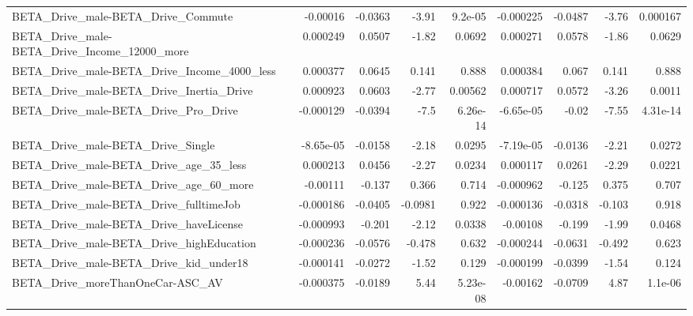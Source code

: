 \begin{tabular}{lrrrrrrrr}
BETA\_Drive\_male-BETA\_Drive\_Commute                 &    -0.00016 &      -0.0363 &    -3.91 &  9.2e-05 &  -0.000225 &     -0.0487 &        -3.76 &      0.000167 \\
BETA\_Drive\_male-BETA\_Drive\_Income\_12000\_more       &    0.000249 &       0.0507 &    -1.82 &   0.0692 &   0.000271 &      0.0578 &        -1.86 &        0.0629 \\
BETA\_Drive\_male-BETA\_Drive\_Income\_4000\_less        &    0.000377 &       0.0645 &    0.141 &    0.888 &   0.000384 &       0.067 &        0.141 &         0.888 \\
BETA\_Drive\_male-BETA\_Drive\_Inertia\_Drive           &    0.000923 &       0.0603 &    -2.77 &  0.00562 &   0.000717 &      0.0572 &        -3.26 &        0.0011 \\
BETA\_Drive\_male-BETA\_Drive\_Pro\_Drive               &   -0.000129 &      -0.0394 &     -7.5 & 6.26e-14 &  -6.65e-05 &       -0.02 &        -7.55 &      4.31e-14 \\
BETA\_Drive\_male-BETA\_Drive\_Single                  &   -8.65e-05 &      -0.0158 &    -2.18 &   0.0295 &  -7.19e-05 &     -0.0136 &        -2.21 &        0.0272 \\
BETA\_Drive\_male-BETA\_Drive\_age\_35\_less             &    0.000213 &       0.0456 &    -2.27 &   0.0234 &   0.000117 &      0.0261 &        -2.29 &        0.0221 \\
BETA\_Drive\_male-BETA\_Drive\_age\_60\_more             &    -0.00111 &       -0.137 &    0.366 &    0.714 &  -0.000962 &      -0.125 &        0.375 &         0.707 \\
BETA\_Drive\_male-BETA\_Drive\_fulltimeJob             &   -0.000186 &      -0.0405 &  -0.0981 &    0.922 &  -0.000136 &     -0.0318 &       -0.103 &         0.918 \\
BETA\_Drive\_male-BETA\_Drive\_haveLicense             &   -0.000993 &       -0.201 &    -2.12 &   0.0338 &   -0.00108 &      -0.199 &        -1.99 &        0.0468 \\
BETA\_Drive\_male-BETA\_Drive\_highEducation           &   -0.000236 &      -0.0576 &   -0.478 &    0.632 &  -0.000244 &     -0.0631 &       -0.492 &         0.623 \\
BETA\_Drive\_male-BETA\_Drive\_kid\_under18             &   -0.000141 &      -0.0272 &    -1.52 &    0.129 &  -0.000199 &     -0.0399 &        -1.54 &         0.124 \\
BETA\_Drive\_moreThanOneCar-ASC\_AV                   &   -0.000375 &      -0.0189 &     5.44 & 5.23e-08 &   -0.00162 &     -0.0709 &         4.87 &       1.1e-06 \\

\end{tabular}
